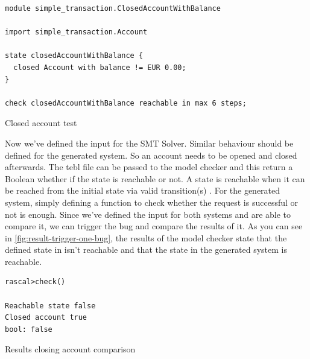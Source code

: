 \begin{sourcecode}[h!]
\begin{lstlisting}[]
module simple_transaction.ClosedAccountWithBalance

import simple_transaction.Account 

state closedAccountWithBalance {
  closed Account with balance != EUR 0.00;
}

check closedAccountWithBalance reachable in max 6 steps;
\end{lstlisting}
\caption{Closed account test}
\label{fig:tebl-closed-account}
\end{sourcecode}

Now we've defined the input for the SMT Solver. Similar behaviour should be defined for the generated system. So an account needs to be opened and closed afterwards.  The tebl file can be passed to the model checker and this return a Boolean whether if the state is reachable or not. A state is reachable when it can be reached from the initial state via valid transition(s) \cite[p.4]{stoel_storm_vinju_bosman_2016}. For the generated system, simply defining a function to check whether the request is successful or not is enough. Since we've defined the input for both systems and are able to compare it, we can trigger the bug and compare the results of it. As you can see in \autoref{fig:result-trigger-one-bug}, the results of the model checker state that the defined state in \label{fig:tebl-closed-account} isn't reachable and that the state in the generated system is reachable. 

  
  
  
  

\begin{sourcecode}[h!]
\begin{lstlisting}[]
rascal>check()

Reachable state false
Closed account true
bool: false
\end{lstlisting}
\caption{Results closing account comparison}
\label{fig:result-trigger-one-bug}
\end{sourcecode}

